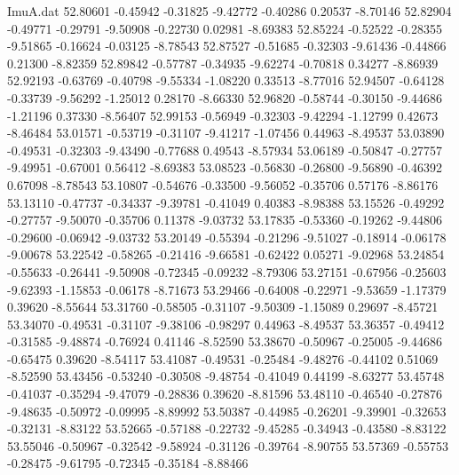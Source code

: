 \begin{filecontents}{ImuA.dat}
  52.80601   -0.45942   -0.31825   -9.42772   -0.40286    0.20537   -8.70146
  52.82904   -0.49771   -0.29791   -9.50908   -0.22730    0.02981   -8.69383
  52.85224   -0.52522   -0.28355   -9.51865   -0.16624   -0.03125   -8.78543
  52.87527   -0.51685   -0.32303   -9.61436   -0.44866    0.21300   -8.82359
  52.89842   -0.57787   -0.34935   -9.62274   -0.70818    0.34277   -8.86939
  52.92193   -0.63769   -0.40798   -9.55334   -1.08220    0.33513   -8.77016
  52.94507   -0.64128   -0.33739   -9.56292   -1.25012    0.28170   -8.66330
  52.96820   -0.58744   -0.30150   -9.44686   -1.21196    0.37330   -8.56407
  52.99153   -0.56949   -0.32303   -9.42294   -1.12799    0.42673   -8.46484
  53.01571   -0.53719   -0.31107   -9.41217   -1.07456    0.44963   -8.49537
  53.03890   -0.49531   -0.32303   -9.43490   -0.77688    0.49543   -8.57934
  53.06189   -0.50847   -0.27757   -9.49951   -0.67001    0.56412   -8.69383
  53.08523   -0.56830   -0.26800   -9.56890   -0.46392    0.67098   -8.78543
  53.10807   -0.54676   -0.33500   -9.56052   -0.35706    0.57176   -8.86176
  53.13110   -0.47737   -0.34337   -9.39781   -0.41049    0.40383   -8.98388
  53.15526   -0.49292   -0.27757   -9.50070   -0.35706    0.11378   -9.03732
  53.17835   -0.53360   -0.19262   -9.44806   -0.29600   -0.06942   -9.03732
  53.20149   -0.55394   -0.21296   -9.51027   -0.18914   -0.06178   -9.00678
  53.22542   -0.58265   -0.21416   -9.66581   -0.62422    0.05271   -9.02968
  53.24854   -0.55633   -0.26441   -9.50908   -0.72345   -0.09232   -8.79306
  53.27151   -0.67956   -0.25603   -9.62393   -1.15853   -0.06178   -8.71673
  53.29466   -0.64008   -0.22971   -9.53659   -1.17379    0.39620   -8.55644
  53.31760   -0.58505   -0.31107   -9.50309   -1.15089    0.29697   -8.45721
  53.34070   -0.49531   -0.31107   -9.38106   -0.98297    0.44963   -8.49537
  53.36357   -0.49412   -0.31585   -9.48874   -0.76924    0.41146   -8.52590
  53.38670   -0.50967   -0.25005   -9.44686   -0.65475    0.39620   -8.54117
  53.41087   -0.49531   -0.25484   -9.48276   -0.44102    0.51069   -8.52590
  53.43456   -0.53240   -0.30508   -9.48754   -0.41049    0.44199   -8.63277
  53.45748   -0.41037   -0.35294   -9.47079   -0.28836    0.39620   -8.81596
  53.48110   -0.46540   -0.27876   -9.48635   -0.50972   -0.09995   -8.89992
  53.50387   -0.44985   -0.26201   -9.39901   -0.32653   -0.32131   -8.83122
  53.52665   -0.57188   -0.22732   -9.45285   -0.34943   -0.43580   -8.83122
  53.55046   -0.50967   -0.32542   -9.58924   -0.31126   -0.39764   -8.90755
  53.57369   -0.55753   -0.28475   -9.61795   -0.72345   -0.35184   -8.88466

\end{filecontents}
